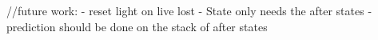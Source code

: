 

//future work:
- reset light on live lost
- State only needs the after states
- prediction should be done on the stack of after states